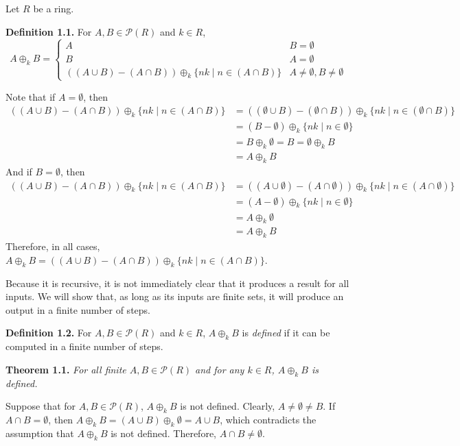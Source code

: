 \documentclass{article}
\begin{document}
Let $R$ be a ring.

\textbf{Definition 1.1.} For $A, B \in \mathcal{P}(R)$ and $k \in R$,
\[A \oplus_k B = \begin{cases}
    A & B = \emptyset \\
    B & A = \emptyset \\
    ((A \cup B) - (A \cap B)) \oplus_k \{nk \mid n \in (A \cap B)\}
        & A \neq \emptyset, B \neq \emptyset
\end{cases}\]

Note that if $A = \emptyset$, then
\[\begin{split}
    ((A \cup B) - (A \cap B)) \oplus_k \{nk \mid n \in (A \cap B)\}
    &= ((\emptyset \cup B) - (\emptyset \cap B))
        \oplus_k \{nk \mid n \in (\emptyset \cap B)\} \\
    &= (B - \emptyset) \oplus_k \{nk \mid n \in \emptyset\} \\
    &= B \oplus_k \emptyset = B = \emptyset \oplus_k B \\
    &= A \oplus_k B
\end{split}\]
And if $B = \emptyset$, then
\[\begin{split}
    ((A \cup B) - (A \cap B)) \oplus_k \{nk \mid n \in (A \cap B)\}
    &= ((A \cup \emptyset) - (A \cap \emptyset))
        \oplus_k \{nk \mid n \in (A \cap \emptyset)\} \\
    &= (A - \emptyset) \oplus_k \{nk \mid n \in \emptyset\} \\
    &= A \oplus_k \emptyset \\
    &= A \oplus_k B
\end{split}\]
Therefore, in all cases,
$A \oplus_k B
= ((A \cup B) - (A \cap B)) \oplus_k \{nk \mid n \in (A \cap B)\}$.

Because it is recursive, it is not immediately clear that it
produces a result for all inputs. We will show that, as long
as its inputs are finite sets, it will produce an output
in a finite number of steps.

\textbf{Definition 1.2.} For $A, B \in \mathcal{P}(R)$ and $k \in R$,
$A \oplus_k B$ is \textit{defined} if it can be computed in a finite
number of steps.

\textbf{Theorem 1.1.} \textit{
    For all finite $A, B \in \mathcal{P}(R)$
    and for any $k \in R$,
    $A \oplus_k B$ is defined.
}

Suppose that for $A, B \in \mathcal{P}(R)$, $A \oplus_k B$ is not
defined. Clearly, $A \neq \emptyset \neq B$. If $A \cap B = \emptyset$,
then $A \oplus_k B = (A \cup B) \oplus_k \emptyset = A \cup B$, which
contradicts the assumption that $A \oplus_k B$ is not defined.
Therefore, $A \cap B \neq \emptyset$.
\end{document}
